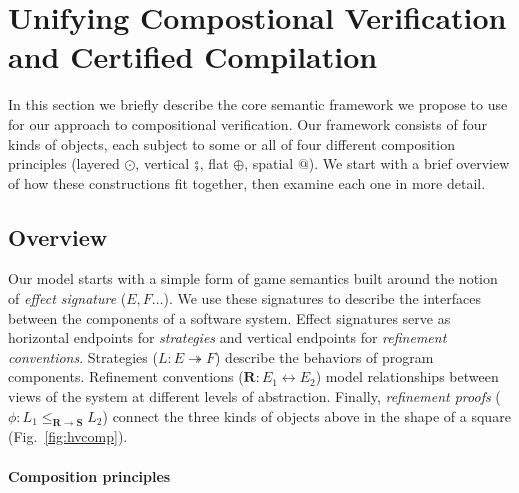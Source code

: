 \section{Unifying Compostional Verification and Certified Compilation}
\label{sec:compcerto}

In this section we briefly describe the core semantic framework
we propose to use for our approach to compositional verification.
%
Our framework consists of four kinds of objects,
each subject to some or all of four
different composition principles
(layered $\odot$,
 vertical $\fatsemi$,
 flat $\oplus$,
 spatial $\mathbin@$).
We start with a brief overview of how these constructions fit together,
then examine each one in more detail.

\subsection{Overview} %


Our model starts with a simple form of game semantics
built around the notion of \emph{effect signature} ($E, F\ldots$).
We use these signatures to describe the
interfaces between the components of a software system.
Effect signatures serve
as horizontal endpoints for \emph{strategies}
and vertical endpoints for \emph{refinement conventions}.
Strategies
($L : E \twoheadrightarrow F$)
describe the behaviors of program components.
Refinement conventions
($\mathbf{R} : E_1 \leftrightarrow E_2$)
model relationships between
views of the system at different levels of abstraction.
Finally,
\emph{refinement proofs}
($\phi : L_1 \le_{\mathbf{R} \rightarrow \mathbf{S}} L_2$)
connect the three kinds of objects above
in the shape of a square (Fig.~\ref{fig:hvcomp}).


\paragraph{Composition principles} %

